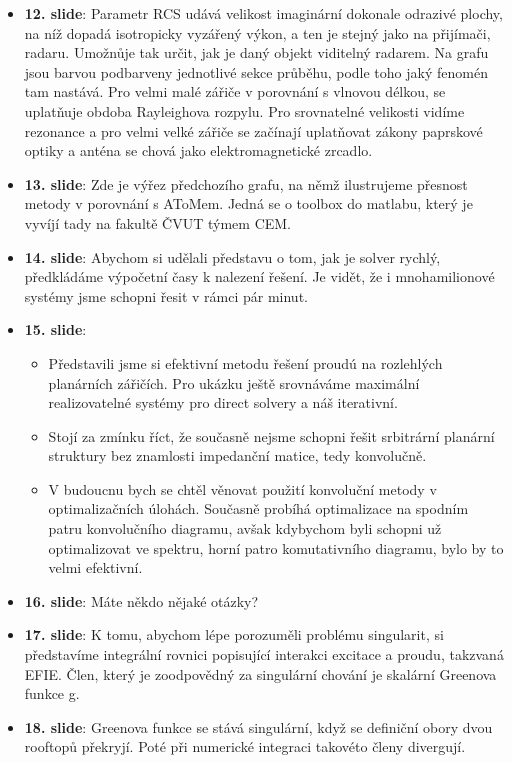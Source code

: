 \documentclass[12pt]{article}
\begin{document}
\begin{itemize}
        \item \textbf{12. slide}: Parametr RCS udává velikost imaginární dokonale odrazivé plochy, na níž dopadá isotropicky vyzářený výkon, a ten je stejný jako na přijímači, radaru. Umožnůje tak určit, jak je daný objekt viditelný radarem. Na grafu jsou barvou podbarveny jednotlivé sekce průběhu, podle toho jaký fenomén tam nastává. Pro velmi malé zářiče v porovnání s vlnovou délkou, se uplatňuje obdoba Rayleighova rozpylu. Pro srovnatelné velikosti vidíme rezonance a pro velmi velké zářiče se začínají uplatňovat zákony paprskové optiky a anténa se chová jako elektromagnetické zrcadlo.
        \item \textbf{13. slide}: Zde je výřez předchozího grafu, na němž ilustrujeme přesnost metody v porovnání s AToMem. Jedná se o toolbox do matlabu, který je vyvíjí tady na fakultě ČVUT týmem CEM.
        \item \textbf{14. slide}: Abychom si udělali představu o tom, jak je solver rychlý, předkládáme výpočetní časy k nalezení řešení. Je vidět, že i mnohamilionové systémy jsme schopni řesit v rámci pár minut.
        \item \textbf{15. slide}:
            \begin{itemize}
                \item Představili jsme si efektivní metodu řešení proudú na rozlehlých planárních zářičích. Pro ukázku ještě srovnáváme maximální realizovatelné systémy pro direct solvery a náš iterativní.
                \item Stojí za zmínku říct, že současně nejsme schopni řešit srbitrární planární struktury bez znamlosti impedanční matice, tedy konvolučně.
                \item V budoucnu bych se chtěl věnovat použití konvoluční metody v optimalizačních úlohách. Současně probíhá optimalizace na spodním patru konvolučního diagramu, avšak kdybychom byli schopni už optimalizovat ve spektru, horní patro komutativního diagramu, bylo by to velmi efektivní.
            \end{itemize}
        \item \textbf{16. slide}: Máte někdo nějaké otázky?
        \item \textbf{17. slide}: K tomu, abychom lépe porozuměli problému singularit, si představíme integrální rovnici popisující interakci excitace a proudu, takzvaná EFIE. Člen, který je zoodpovědný za singulární chování je skalární Greenova funkce g.
        \item \textbf{18. slide}: Greenova funkce se stává singulární, když se definiční obory dvou rooftopů překryjí. Poté při numerické integraci takovéto členy divergují.

\end{itemize}
\end{document}
